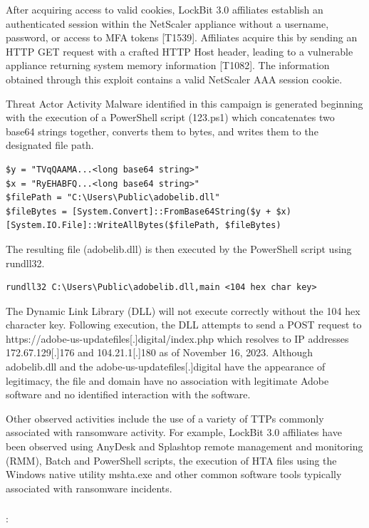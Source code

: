 \documentclass{article}
\begin{document}
After acquiring access to valid cookies, LockBit 3.0 affiliates establish an authenticated session within the NetScaler appliance without a username, password, or access to MFA tokens [T1539]. Affiliates acquire this by sending an HTTP GET request with a crafted HTTP Host header, leading to a vulnerable appliance returning system memory information [T1082]. The information obtained through this exploit contains a valid NetScaler AAA session cookie.

Threat Actor Activity
Malware identified in this campaign is generated beginning with the execution of a PowerShell script (123.ps1) which concatenates two base64 strings together, converts them to bytes, and writes them to the designated file path.

\begin{verbatim}
$y = "TVqQAAMA...<long base64 string>"
$x = "RyEHABFQ...<long base64 string>"
$filePath = "C:\Users\Public\adobelib.dll"
$fileBytes = [System.Convert]::FromBase64String($y + $x)
[System.IO.File]::WriteAllBytes($filePath, $fileBytes)
\end{verbatim}

The resulting file (adobelib.dll) is then executed by the PowerShell script using rundll32.

\begin{verbatim}
rundll32 C:\Users\Public\adobelib.dll,main <104 hex char key>
\end{verbatim}

The Dynamic Link Library (DLL) will not execute correctly without the 104 hex character key. Following execution, the DLL attempts to send a POST request to https://adobe-us-updatefiles[.]digital/index.php which resolves to IP addresses 172.67.129[.]176 and 104.21.1[.]180 as of November 16, 2023. Although adobelib.dll and the adobe-us-updatefiles[.]digital have the appearance of legitimacy, the file and domain have no association with legitimate Adobe software and no identified interaction with the software.

Other observed activities include the use of a variety of TTPs commonly associated with ransomware activity. For example, LockBit 3.0 affiliates have been observed using AnyDesk and Splashtop remote management and monitoring (RMM), Batch and PowerShell scripts, the execution of HTA files using the Windows native utility mshta.exe and other common software tools typically associated with ransomware incidents.

\subsubsection{\textcite{CVE-2023-3467}}
\textbf{}: 
\end{document}
